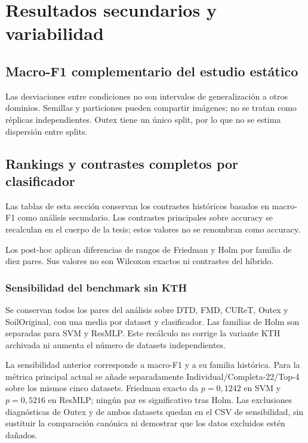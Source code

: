 \chapter{Resultados secundarios y variabilidad}\label{app:resultados-adicionales}

\section{Macro-F1 complementario del estudio estático}


Las desviaciones entre condiciones no son intervalos de generalización a otros dominios. Semillas y particiones pueden compartir imágenes; no se tratan como réplicas independientes. Outex tiene un único split, por lo que no se estima dispersión entre splits.

\section{Rankings y contrastes completos por clasificador}
Las tablas de esta sección conservan los contrastes históricos basados en macro-F1 como análisis secundario. Los contrastes principales sobre accuracy se recalculan en el cuerpo de la tesis; estos valores no se renombran como accuracy.



Los post-hoc aplican diferencias de rangos de Friedman y Holm por familia de diez pares. Sus valores no son Wilcoxon exactos ni contrastes del híbrido.
\FloatBarrier

\subsection{Sensibilidad del benchmark sin KTH}
Se conservan todos los pares del análisis sobre DTD, FMD, CUReT, Outex y SoilOriginal, con una media por dataset y clasificador. Las familias de Holm son separadas para SVM y ResMLP. Este recálculo no corrige la variante KTH archivada ni aumenta el número de datasets independientes.


\FloatBarrier

La sensibilidad anterior corresponde a macro-F1 y a su familia histórica. Para la métrica principal actual se añade separadamente Individual/Completa-22/Top-4 sobre los mismos cinco datasets. Friedman exacto da \(p=0,1242\) en SVM y \(p=0,5216\) en ResMLP; ningún par es significativo tras Holm. Las exclusiones diagnósticas de Outex y de ambos datasets quedan en el CSV de sensibilidad, sin sustituir la comparación canónica ni demostrar que los datos excluidos estén dañados.



